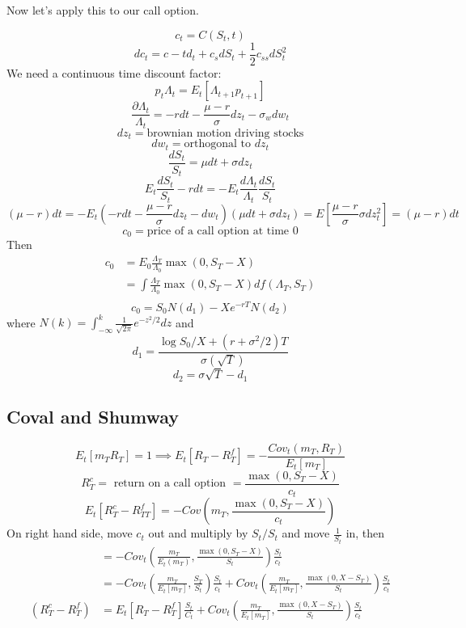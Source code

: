 \documentclass[11pt, a4paper, oneside]{article}
\theoremstyle{definition}
\theoremstyle{proposition}
\theoremstyle{corollary}
\theoremstyle{lemma}
\theoremstyle{theorem}
\begin{document}
Now let's apply this to our call option.

$$c_t = C(S_t, t)$$
$$dc_t = c-t d_t + c_sdS_t + \frac{1}{2}c_{ss} dS_t^2$$
We need a continuous time discount factor:
$$p_t\Lambda_t = E_t[\Lambda_{t+1}p_{t+1}]$$
$$\frac{\partial \Lambda_t}{\Lambda_t} = - rdt -\frac{\mu-r}{\sigma} dz_t - \sigma_w dw_t$$
$$dz_t = \text{brownian motion driving stocks}$$
$$dw_t = \text{orthogonal to }dz_t$$
$$\frac{d S_t}{S_t} = \mu dt + \sigma dz_t$$ 
$$E_t\frac{d S_t}{S_t} - rdt = - E_t\frac{d \Lambda_t}{\Lambda_t}\frac{d S_t}{S_t}$$
$$(\mu- r) dt = - E_t(-rdt - \frac{\mu-r}{\sigma} dz_t - dw_t)(\mu d t + \sigma dz_t) = E[\frac{\mu - r}{\sigma} \sigma dz_t^2] = (\mu -r)dt$$
$$c_0 = \text{price of a call option at time 0}$$
Then 
\begin{align*}
c_0 &= E_0\frac{\Lambda_T}{\Lambda_0}\max(0, S_T- X)\\
&= \int \frac{\Lambda_T}{\Lambda_0}\max(0, S_T- X) df(\Lambda_T, S_T)\\
\end{align*}
$$c_0 = S_0 N(d_1) - Xe^{-rT}N(d_2)$$
where $N(k) = \int_{-\infty}^k \frac{1}{\sqrt{2\pi}} e^{-z^2/2} dz$ and $$d_1 = \frac{\log{S_0/X} + (r+\sigma^2/2)T}{\sigma(\sqrt{T})}$$
$$d_2 = \sigma \sqrt{T} - d_1$$
 
\subsection{Coval and Shumway} 
$$E_t[m_{T}R_{T}] = 1\implies E_t[R_{T}- R_{T}^f] = -\frac{Cov_t(m_{T}, R_{T})}{E_t[m_{T}]}$$
$$R_{T}^c = \text{ return on a call option }= \frac{\max(0, S_T - X)}{c_{t}}$$
$$E_t[R_{T}^c- R_{TT}^f] = - Cov(m_{T}, \frac{\max(0, S_T - X)}{c_t})$$
On right hand side, move $c_t$ out and multiply by $S_t/S_t$ and move $\frac{1}{S_t}$ in, then
\begin{align*}
&=-Cov_t\left(\frac{m_{T}}{E_t(m_{T})}, \frac{\max(0, S_T - X)}{S_t}\right)\frac{S_t}{c_t}\\
&=-Cov_t\left(\frac{m_{T}}{E_t[m_{T}]}, \frac{S_{T}}{S_t}\right)\frac{S_t}{c_t} + Cov_t\left(\frac{m_{T}}{E_t[m_{T}]}, \frac{\max(0, X - S_T)}{S_t}\right)\frac{S_t}{c_t}\\
(R_{T}^c-R_{T}^f)&=E_t[R_{T} - R_{T}^f]\frac{S_t}{C_t} + Cov_t\left(\frac{m_{T}}{E_t[m_{T}]}, \frac{\max(0, X - S_T)}{S_t}\right)\frac{S_t}{c_t}
\end{align*}
\end{document}
